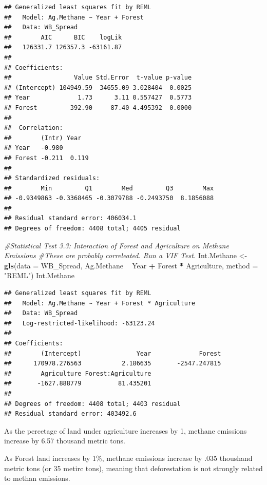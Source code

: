 \documentclass[12pt,]{article}
\newenvironment{Shaded}{\begin{snugshade}}{\end{snugshade}}
\newcommand{\KeywordTok}[1]{\textcolor[rgb]{0.13,0.29,0.53}{\textbf{#1}}}
\newcommand{\DataTypeTok}[1]{\textcolor[rgb]{0.13,0.29,0.53}{#1}}
\newcommand{\StringTok}[1]{\textcolor[rgb]{0.31,0.60,0.02}{#1}}
\newcommand{\CommentTok}[1]{\textcolor[rgb]{0.56,0.35,0.01}{\textit{#1}}}
\newcommand{\OperatorTok}[1]{\textcolor[rgb]{0.81,0.36,0.00}{\textbf{#1}}}
\newcommand{\NormalTok}[1]{#1}
\begin{document}
\begin{verbatim}
## Generalized least squares fit by REML
##   Model: Ag.Methane ~ Year + Forest 
##   Data: WB_Spread 
##        AIC      BIC    logLik
##   126331.7 126357.3 -63161.87
## 
## Coefficients:
##                 Value Std.Error  t-value p-value
## (Intercept) 104949.59  34655.09 3.028404  0.0025
## Year             1.73      3.11 0.557427  0.5773
## Forest         392.90     87.40 4.495392  0.0000
## 
##  Correlation: 
##        (Intr) Year  
## Year   -0.980       
## Forest -0.211  0.119
## 
## Standardized residuals:
##        Min         Q1        Med         Q3        Max 
## -0.9349863 -0.3368465 -0.3079788 -0.2493750  8.1856088 
## 
## Residual standard error: 406034.1 
## Degrees of freedom: 4408 total; 4405 residual
\end{verbatim}

\begin{Shaded}
\begin{Highlighting}[]
\CommentTok{#Statistical Test 3.3: Interaction of Forest and Agriculture on Methane Emissions #These are probably correleated. Run a VIF Test. }
\NormalTok{Int.Methane <-}\StringTok{  }\KeywordTok{gls}\NormalTok{(}\DataTypeTok{data =}\NormalTok{ WB_Spread,}
\NormalTok{                    Ag.Methane }\OperatorTok{~}\StringTok{ }\NormalTok{Year }\OperatorTok{+}\StringTok{ }\NormalTok{Forest }\OperatorTok{*}\StringTok{ }\NormalTok{Agriculture,}
                    \DataTypeTok{method =} \StringTok{"REML"}\NormalTok{)}
\NormalTok{Int.Methane }
\end{Highlighting}
\end{Shaded}

\begin{verbatim}
## Generalized least squares fit by REML
##   Model: Ag.Methane ~ Year + Forest * Agriculture 
##   Data: WB_Spread 
##   Log-restricted-likelihood: -63123.24
## 
## Coefficients:
##        (Intercept)               Year             Forest 
##      170978.276563           2.186635       -2547.247815 
##        Agriculture Forest:Agriculture 
##       -1627.888779          81.435201 
## 
## Degrees of freedom: 4408 total; 4403 residual
## Residual standard error: 403492.6
\end{verbatim}

As the percetage of land under agriculture increases by 1, methane
emissions increase by 6.57 thousand metric tons.

As Forest land increases by 1\%, methane emissions increase by .035
thoushand metric tons (or 35 metirc tons), meaning that deforestation is
not strongly related to methan emissions.
\end{document}
